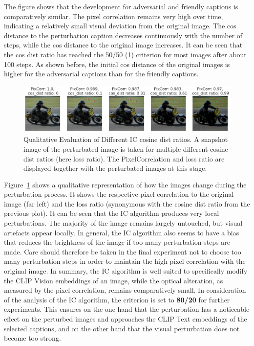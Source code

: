 The figure shows that the development for adversarial and friendly captions is comparatively similar. The pixel correlation remains very high over time, indicating a relatively small visual deviation from the original image. The cos distance to the perturbation caption decreases continuously with the number of steps, while the cos distance to the original image increases. It can be seen that the cos dist ratio has reached the 50/50 (1) criterion for most images after about 100 steps. As shown before, the initial cos distance of the original images is higher for the adversarial captions than for the friendly captions.


\begin{figure}[ht]
    \centering
    \includegraphics[width=1\textwidth]{plots/advpert_ic_qual_validation_evolution.png}
    \caption[Qualitative Evaluation of Different IC cosine dist ratios]{Qualitative Evaluation of Different IC cosine dist ratios. A snapshot image of the perturbated image is taken for multiple different cosine dist ratios (here loss ratio). The PixelCorrelation and loss ratio are displayed together with the perturbated images at this stage.}\label{fig:advpert_ic_qual_validation_evolution}
\end{figure}

Figure~\ref{fig:advpert_ic_qual_validation_evolution} shows a qualitative representation of how the images change during the perturbation process. It shows the respective pixel correlation to the original image (far left) and the loss ratio (synonymous with the cosine dist ratio from the previous plot). It can be seen that the IC algorithm produces very local perturbations. The majority of the image remains largely untouched, but visual artefacts appear locally. In general, the IC algorithm also seems to have a bias that reduces the brightness of the image if too many perturbation steps are made. Care should therefore be taken in the final experiment not to choose too many perturbation steps in order to maintain the high pixel correlation with the original image. In summary, the IC algorithm is well suited to specifically modify the CLIP Vision embeddings of an image, while the optical alteration, as measured by the pixel correlation, remains comparatively small. In consideration of the analysis of the IC algorithm, the criterion is set to \textbf{80/20} for further experiments. This ensures on the one hand that the perturbation has a noticeable effect on the perturbed images and approaches the CLIP Text embeddings of the selected captions, and on the other hand that the visual perturbation does not become too strong. 



